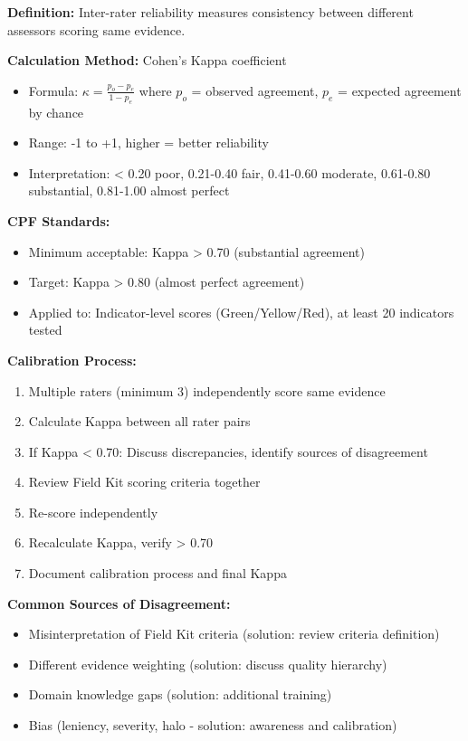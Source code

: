 \documentclass[11pt,a4paper]{article}
\begin{document}
\textbf{Definition:} Inter-rater reliability measures consistency between different assessors scoring same evidence.

\textbf{Calculation Method:} Cohen's Kappa coefficient
\begin{itemize}
\item Formula: $\kappa = \frac{p_o - p_e}{1 - p_e}$ where $p_o$ = observed agreement, $p_e$ = expected agreement by chance
\item Range: -1 to +1, higher = better reliability
\item Interpretation: < 0.20 poor, 0.21-0.40 fair, 0.41-0.60 moderate, 0.61-0.80 substantial, 0.81-1.00 almost perfect
\end{itemize}

\textbf{CPF Standards:}
\begin{itemize}
\item Minimum acceptable: Kappa > 0.70 (substantial agreement)
\item Target: Kappa > 0.80 (almost perfect agreement)
\item Applied to: Indicator-level scores (Green/Yellow/Red), at least 20 indicators tested
\end{itemize}

\textbf{Calibration Process:}
\begin{enumerate}
\item Multiple raters (minimum 3) independently score same evidence
\item Calculate Kappa between all rater pairs
\item If Kappa < 0.70: Discuss discrepancies, identify sources of disagreement
\item Review Field Kit scoring criteria together
\item Re-score independently
\item Recalculate Kappa, verify > 0.70
\item Document calibration process and final Kappa
\end{enumerate}

\textbf{Common Sources of Disagreement:}
\begin{itemize}
\item Misinterpretation of Field Kit criteria (solution: review criteria definition)
\item Different evidence weighting (solution: discuss quality hierarchy)
\item Domain knowledge gaps (solution: additional training)
\item Bias (leniency, severity, halo - solution: awareness and calibration)
\end{itemize}
\end{document}
